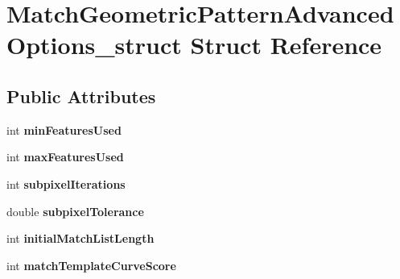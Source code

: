 \hypertarget{structMatchGeometricPatternAdvancedOptions__struct}{\section{\-Match\-Geometric\-Pattern\-Advanced\-Options\-\_\-struct \-Struct \-Reference}
\label{structMatchGeometricPatternAdvancedOptions__struct}
}
\subsection*{\-Public \-Attributes}
\begin{DoxyCompactItemize}
\item 
\hypertarget{structMatchGeometricPatternAdvancedOptions__struct_a3404ce486e3357e219453ff8784a9b34}{int {\bfseries min\-Features\-Used}}\label{structMatchGeometricPatternAdvancedOptions__struct_a3404ce486e3357e219453ff8784a9b34}

\item 
\hypertarget{structMatchGeometricPatternAdvancedOptions__struct_a2ca01bbcdb8d968124a626c183afb075}{int {\bfseries max\-Features\-Used}}\label{structMatchGeometricPatternAdvancedOptions__struct_a2ca01bbcdb8d968124a626c183afb075}

\item 
\hypertarget{structMatchGeometricPatternAdvancedOptions__struct_a7f5d0e133a2de4433536309887ca57df}{int {\bfseries subpixel\-Iterations}}\label{structMatchGeometricPatternAdvancedOptions__struct_a7f5d0e133a2de4433536309887ca57df}

\item 
\hypertarget{structMatchGeometricPatternAdvancedOptions__struct_ab2ec5c7a9d58f98b03a155200e91e011}{double {\bfseries subpixel\-Tolerance}}\label{structMatchGeometricPatternAdvancedOptions__struct_ab2ec5c7a9d58f98b03a155200e91e011}

\item 
\hypertarget{structMatchGeometricPatternAdvancedOptions__struct_a830ca43adb6865a7fa5a000e275a2006}{int {\bfseries initial\-Match\-List\-Length}}\label{structMatchGeometricPatternAdvancedOptions__struct_a830ca43adb6865a7fa5a000e275a2006}

\item 
\hypertarget{structMatchGeometricPatternAdvancedOptions__struct_ae570d5a18234d831a44fc0d02c4e7819}{int {\bfseries match\-Template\-Curve\-Score}}\label{structMatchGeometricPatternAdvancedOptions__struct_ae570d5a18234d831a44fc0d02c4e7819}


\end{DoxyCompactItemize}

